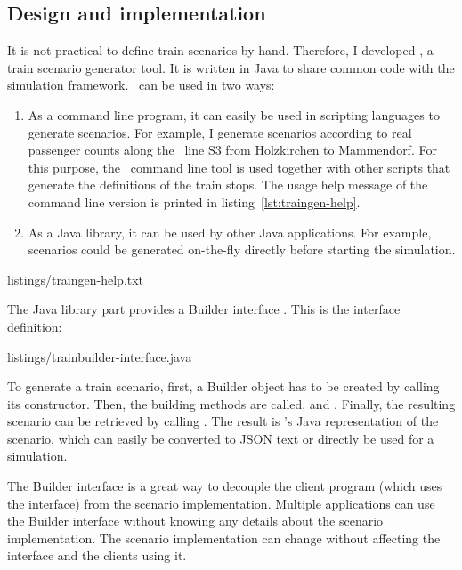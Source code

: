 \subsection{Design and implementation}

It is not practical to define train scenarios by hand.
Therefore, I developed \traingen, a train scenario generator tool.
It is written in Java to share common code with the simulation framework.
\traingen\ can be used in two ways:

\begin{enumerate}

    \item As a command line program, it can easily be used in scripting
    languages to generate scenarios.
    For example, I generate scenarios according to real passenger counts along
    the \sbahn\ line S3 from Holzkirchen to Mammendorf.
    For this purpose, the \traingen\ command line tool is used together with
    other scripts that generate the definitions of the train stops.
    The usage help message of the command line version is printed
    in listing~\ref{lst:traingen-help}.

    \item As a Java library, it can be used by other Java applications.
    For example, scenarios could be generated on-the-fly directly before
    starting the simulation.

\end{enumerate}

%
{listings/traingen-help.txt}

The Java library part provides a Builder interface \citep{gamma-1995}.
This is the interface definition:

%
{listings/trainbuilder-interface.java}

To generate a train scenario, first, a Builder object has to be created by
calling its constructor.
Then, the building methods are called, \eg {} and .
Finally, the resulting scenario can be retrieved by calling .
The result is \vadere's Java representation of the scenario, which can easily be
converted to \acs{JSON} text or directly be used for a simulation.

The Builder interface is a great way to decouple the client program (which uses
the interface) from the scenario implementation.
Multiple applications can use the Builder interface without knowing any details
about the scenario implementation.
The scenario implementation can change without affecting the interface and the
clients using it.

